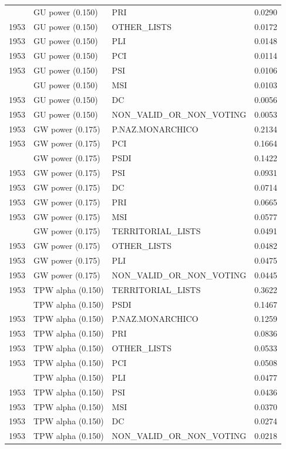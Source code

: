 \begin{longtable}[t]{rllr}
\addlinespace
1953 & GU power (0.150) & PRI & 0.0290\\
1953 & GU power (0.150) & OTHER\_LISTS & 0.0172\\
1953 & GU power (0.150) & PLI & 0.0148\\
1953 & GU power (0.150) & PCI & 0.0114\\
1953 & GU power (0.150) & PSI & 0.0106\\
\addlinespace
1953 & GU power (0.150) & MSI & 0.0103\\
1953 & GU power (0.150) & DC & 0.0056\\
1953 & GU power (0.150) & NON\_VALID\_OR\_NON\_VOTING & 0.0053\\
1953 & GW power (0.175) & P.NAZ.MONARCHICO & 0.2134\\
1953 & GW power (0.175) & PCI & 0.1664\\
\addlinespace
1953 & GW power (0.175) & PSDI & 0.1422\\
1953 & GW power (0.175) & PSI & 0.0931\\
1953 & GW power (0.175) & DC & 0.0714\\
1953 & GW power (0.175) & PRI & 0.0665\\
1953 & GW power (0.175) & MSI & 0.0577\\
\addlinespace
1953 & GW power (0.175) & TERRITORIAL\_LISTS & 0.0491\\
1953 & GW power (0.175) & OTHER\_LISTS & 0.0482\\
1953 & GW power (0.175) & PLI & 0.0475\\
1953 & GW power (0.175) & NON\_VALID\_OR\_NON\_VOTING & 0.0445\\
1953 & TPW alpha (0.150) & TERRITORIAL\_LISTS & 0.3622\\
\addlinespace
1953 & TPW alpha (0.150) & PSDI & 0.1467\\
1953 & TPW alpha (0.150) & P.NAZ.MONARCHICO & 0.1259\\
1953 & TPW alpha (0.150) & PRI & 0.0836\\
1953 & TPW alpha (0.150) & OTHER\_LISTS & 0.0533\\
1953 & TPW alpha (0.150) & PCI & 0.0508\\
\addlinespace
1953 & TPW alpha (0.150) & PLI & 0.0477\\
1953 & TPW alpha (0.150) & PSI & 0.0436\\
1953 & TPW alpha (0.150) & MSI & 0.0370\\
1953 & TPW alpha (0.150) & DC & 0.0274\\
1953 & TPW alpha (0.150) & NON\_VALID\_OR\_NON\_VOTING & 0.0218\\

\end{longtable}
